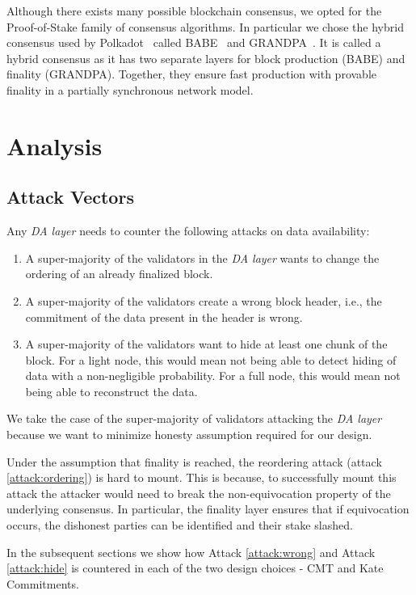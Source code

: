 \documentclass[sigconf, screen=true, nonacm]{acmart}
\newcommand{\DA}{\textit{DA layer}}
\begin{document}
        Although there exists many possible blockchain consensus, we opted for the  Proof-of-Stake family of consensus algorithms. In particular we chose the hybrid consensus used by Polkadot~\cite{polkadot_consensus:2020} called BABE~\cite{BABE:2020} and GRANDPA~\cite{grandpa}. It is called a hybrid consensus as it has two separate layers for block production (BABE) and finality (GRANDPA). Together, they ensure fast production with provable finality in a partially synchronous network model. 

\section{Analysis}
    \subsection{Attack Vectors}
        Any \DA{} needs to counter the following attacks on data availability:
        \begin{enumerate}
            \item \label{attack:ordering} A super-majority of the validators in the \DA{} wants to change the ordering of an already finalized block.
            \item \label{attack:wrong} A super-majority of the validators create a wrong block header, i.e., the commitment of the data present in the header is wrong. 
            \item \label{attack:hide} A super-majority of the validators want to hide at least one chunk of the block. For a light node, this would mean not being able to detect hiding of data with a non-negligible probability. For a full node, this would mean not being able to reconstruct the data. 
        \end{enumerate}

        We take the case of the super-majority of validators attacking the \DA{} because we want to minimize honesty assumption required for our design. 
        
        Under the assumption that finality is reached, the reordering attack (attack \ref{attack:ordering}) is hard to mount. This is because, to successfully mount this attack the attacker would need to break the non-equivocation property of the underlying consensus. In particular, the finality layer ensures that if equivocation occurs, the dishonest parties can be identified and their stake slashed. 

        In the subsequent sections we show how Attack \ref{attack:wrong} and Attack \ref{attack:hide} is countered in each of the two design choices - CMT and Kate Commitments.
\end{document}
